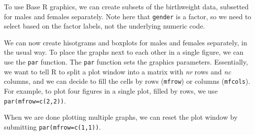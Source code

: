 \documentclass[
]{memoir}
\newenvironment{Shaded}{\begin{snugshade}}{\end{snugshade}}
\newcommand{\AttributeTok}[1]{\textcolor[rgb]{0.77,0.63,0.00}{#1}}
\newcommand{\DecValTok}[1]{\textcolor[rgb]{0.00,0.00,0.81}{#1}}
\newcommand{\FloatTok}[1]{\textcolor[rgb]{0.00,0.00,0.81}{#1}}
\newcommand{\FunctionTok}[1]{\textcolor[rgb]{0.00,0.00,0.00}{#1}}
\newcommand{\NormalTok}[1]{#1}
\newcommand{\OtherTok}[1]{\textcolor[rgb]{0.56,0.35,0.01}{#1}}
\newcommand{\SpecialCharTok}[1]{\textcolor[rgb]{0.00,0.00,0.00}{#1}}
\newcommand{\StringTok}[1]{\textcolor[rgb]{0.31,0.60,0.02}{#1}}
\begin{document}
To use Base R graphics, we can create subsets of the birthweight data, subsetted for males and females separately. Note here that \texttt{gender} is a factor, so we need to select based on the factor labels, not the underlying numeric code.

\begin{Shaded}
\end{Shaded}

We can now create hisotgrams and boxplots for males and females separately, in the usual way. To place the graphs next to each other in a single figure, we can use the \texttt{par} function. The \texttt{par} function sets the graphics parameters. Essentially, we want to tell R to split a plot window into a matrix with \emph{nr} rows and \emph{nc} columns, and we can decide to fill the cells by rows (\texttt{mfrow}) or columns (\texttt{mfcols}). For example, to plot four figures in a single plot, filled by rows, we use \texttt{par(mfrow=c(2,2))}.

When we are done plotting multiple graphs, we can reset the plot window by submitting \texttt{par(mfrow=c(1,1))}.

\begin{Shaded}
\end{Shaded}
\end{document}

